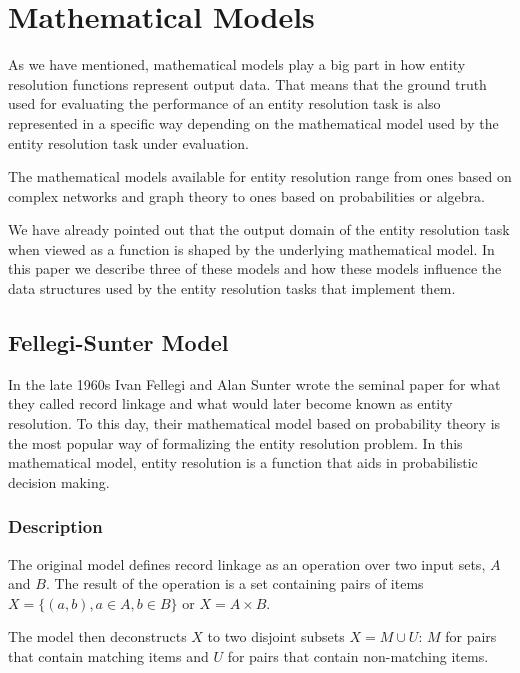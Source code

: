 \documentclass[11pt]{article}
\begin{document}
    \section[mm]{Mathematical Models}\label{sec:mm}

    As we have mentioned, mathematical models play a big part in how entity
    resolution functions represent output data.
    That means that the ground truth used for evaluating the performance of an
    entity resolution task is also represented in a specific way depending on 
    the mathematical model used by the entity resolution task under evaluation.
    
    The mathematical models available for entity resolution range from ones
    based on complex networks and graph theory\cite{Li2020} to ones based on
    probabilities\cite{fs1969} or algebra\cite{Tal11,Ben2009Swoosh}.

    We have already pointed out that the output domain of the entity resolution
    task when viewed as a function is shaped by the underlying mathematical
    model.
    In this paper we describe three of these models and how these models
    influence the data structures used by the entity resolution tasks that
    implement them.

    \subsection[fsm]{Fellegi-Sunter Model}\label{subsec:fsm}

    In the late 1960s Ivan Fellegi and Alan Sunter wrote the seminal
    paper\cite{fs1969} for what they called record linkage and what would later
    become known as entity resolution.
    To this day, their mathematical model based on probability theory is the
    most popular way of formalizing the entity resolution problem.
    In this mathematical model, entity resolution is a function that aids in 
    probabilistic decision making.
    
    \subsubsection[fsm-desc]{Description}\label{subsec:fsm-desc}

    The original model defines record linkage as an operation over two input
    sets, $A$ and $B$.
    The result of the operation is a set containing pairs of items
    $X = \{(a, b), a \in A, b \in B\}$ or $X = A \times B$.
    
    The model then deconstructs $X$ to two disjoint subsets $X = M \cup U$: $M$ for pairs that
    contain matching items and $U$ for pairs that contain non-matching items.
\end{document}
